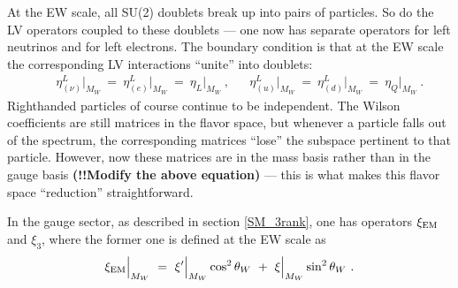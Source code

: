 	At the EW scale, all SU(2) doublets break up into pairs of particles.
	So do the LV operators coupled to these doublets --- one now has
	separate operators for left neutrinos and for left electrons.
	The boundary condition is that at the EW scale the corresponding LV
	interactions ``unite'' into doublets:
\begin{align}
	&& \eta^L_{(\nu)} \Bigr|_{M_W} ~=~ \eta^L_{(e)} \Bigr|_{M_W} 
		~=~ \eta_L \Bigr|_{M_W}~,
	&& \eta^L_{(u)} \Bigr|_{M_W} ~=~ \eta^L_{(d)} \Bigr|_{M_W} 
		~=~ \eta_Q \Bigr|_{M_W}~.
\end{align}
	Righthanded particles of course continue to be independent.
	The Wilson coefficients are still matrices in the flavor space, but
	whenever a particle falls out of the spectrum, the corresponding
	matrices ``lose'' the subspace pertinent to that particle.
	However, now these matrices are in the mass basis rather than
	in the gauge basis {\bf (!!Modify the above equation)} ---
	this is what makes this flavor space ``reduction'' straightforward.

	In the gauge sector, as described in section \ref{SM_3rank}, 
	one has operators $ \xi_{\rm EM} $ and $ \xi_3 $, where 
	the former one is defined at the EW scale as
\[
	\xi_{\rm EM}\Bigr|_{M_W} ~=~ \xi'\Bigr|_{M_W} \cos^2 \theta_W ~+~ 
			\xi\Bigr|_{M_W} \sin^2 \theta_W~.
\]
	

	


